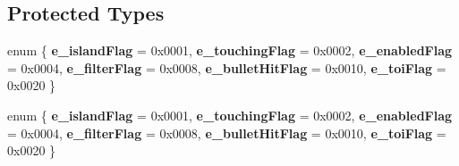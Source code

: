 \subsection*{Protected Types}
\begin{DoxyCompactItemize}
\item 
\mbox{\label{classb2Contact_a0fe49a95ceabce99daccb2733af119fd}} 
enum \{ \newline
{\bfseries e\+\_\+island\+Flag} = 0x0001, 
{\bfseries e\+\_\+touching\+Flag} = 0x0002, 
{\bfseries e\+\_\+enabled\+Flag} = 0x0004, 
{\bfseries e\+\_\+filter\+Flag} = 0x0008, 
\newline
{\bfseries e\+\_\+bullet\+Hit\+Flag} = 0x0010, 
{\bfseries e\+\_\+toi\+Flag} = 0x0020
 \}
\item 
\mbox{\label{classb2Contact_a0e2429fcf1c40d0e9c6a459f1648721f}} 
enum \{ \newline
{\bfseries e\+\_\+island\+Flag} = 0x0001, 
{\bfseries e\+\_\+touching\+Flag} = 0x0002, 
{\bfseries e\+\_\+enabled\+Flag} = 0x0004, 
{\bfseries e\+\_\+filter\+Flag} = 0x0008, 
\newline
{\bfseries e\+\_\+bullet\+Hit\+Flag} = 0x0010, 
{\bfseries e\+\_\+toi\+Flag} = 0x0020
 \}
\end{DoxyCompactItemize}
